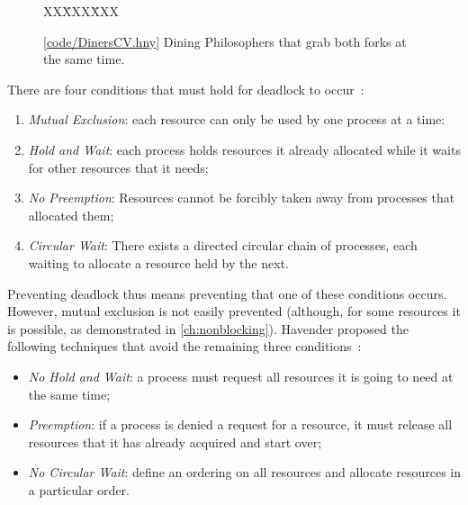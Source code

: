 \documentclass{report}
\newcommand{\harmonysource}[1]{
\begin{tabbing}
XX\=XXX\=XXX\kill
    
\end{tabbing}
}
\newcommand{\harmonylink}[1]{%
[\href{https://www.cs.cornell.edu/home/rvr/harmony/#1}{\underline{#1}}]%
}
\newenvironment{code}{
\tcolorbox
}{
\endtcolorbox
}
\begin{document}
\begin{figure}
\begin{code}
\harmonysource{DinersCV}
\end{code}
\caption{\harmonylink{code/DinersCV.hny} Dining Philosophers that grab both forks at the same time.}
\label{fig:dinerscv}
\end{figure}

\noindent
There are four conditions that must hold for deadlock to occur~\cite{CES71}:
\begin{enumerate}
\item \emph{Mutual Exclusion}: each resource can only be used by one process at a time:
\item \emph{Hold and Wait}: each process holds resources it already allocated while it
waits for other resources that it needs;
\item \emph{No Preemption}: Resources cannot be forcibly taken away from processes that
allocated them;
\item \emph{Circular Wait}: There exists a directed circular chain of processes, each waiting
to allocate a resource held by the next.
\end{enumerate}

Preventing deadlock thus means preventing that one of these conditions occurs.
However, mutual exclusion is not easily prevented (although, for some resources it is
possible, as demonstrated in \autoref{ch:nonblocking}).
Havender proposed the following techniques that avoid the remaining
three conditions~\cite{Havender68}:

\begin{itemize}
\item \emph{No Hold and Wait}: a process must request all resources it is going to
need at the same time;
\item \emph{Preemption}: if a process is denied a request for a resource, it must
release all resources that it has already acquired and start over;
\item \emph{No Circular Wait}: define an ordering on all resources and allocate
resources in a particular order.
\end{itemize}
\end{document}
